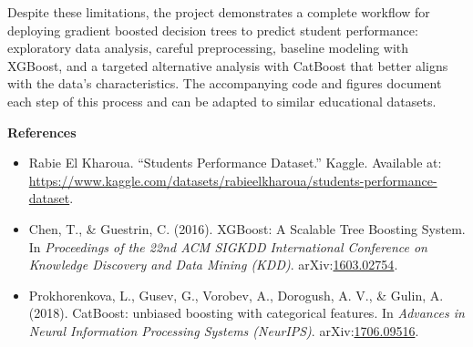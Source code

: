 \documentclass[11pt]{article}
\begin{document}
Despite these limitations, the project demonstrates a complete
workflow for deploying gradient boosted decision trees to predict
student performance: exploratory data analysis, careful preprocessing,
baseline modeling with XGBoost, and a targeted alternative analysis
with CatBoost that better aligns with the data's characteristics.  The
accompanying code and figures document each step of this process and
can be adapted to similar educational datasets.

\vspace{1em}
\noindent\textbf{References}
\begin{itemize}
	\item Rabie El Kharoua. ``Students Performance Dataset.'' Kaggle. Available at: \url{https://www.kaggle.com/datasets/rabieelkharoua/students-performance-dataset}.
	\item Chen, T., \& Guestrin, C. (2016). XGBoost: A Scalable Tree Boosting System. In \emph{Proceedings of the 22nd ACM SIGKDD International Conference on Knowledge Discovery and Data Mining (KDD)}. arXiv:\href{https://arxiv.org/abs/1603.02754}{1603.02754}.
	\item Prokhorenkova, L., Gusev, G., Vorobev, A., Dorogush, A. V., \& Gulin, A. (2018). CatBoost: unbiased boosting with categorical features. In \emph{Advances in Neural Information Processing Systems (NeurIPS)}. arXiv:\href{https://arxiv.org/abs/1706.09516}{1706.09516}.
\end{itemize}
\end{document}
